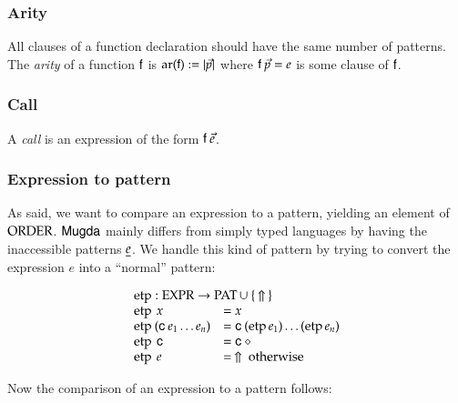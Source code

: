 \newcommand{\cmp}{\opn{cmp}}
\newcommand{\cmpv}{\opn{cmp_v}}
\newcommand{\cmps}{\opn{cmps}}
\newcommand{\cmpsv}{\opn{cmpsv}}
\newcommand{\etp}{\opn{etp}}
\newcommand{\extr}{\opn{extr}}

\newcommand{\ar}{\opn{ar}}

\subsubsection{Arity}
All clauses of a function declaration should have the same number of patterns.\\
The \emph{arity} of a function $\mathsf{f}$  is $\ar(\ff) := \vert \vec{p} \vert $ where $\mathsf{f} \: \vec{p} = e $ is some clause of $\mathsf{f}$.   

\subsubsection{Call}
A \emph{call} is an expression of the form $\mathsf{f} \: \vec{e}$.


\subsubsection{Expression to pattern}

As said, we want to compare an expression to a pattern, yielding an element of $\operatorname{ORDER}$.
$\textsf{Mugda}$ mainly differs from simply typed languages by having the inaccessible patterns $\underline{e}$.
We handle this kind of pattern by trying to convert the expression $e$ into a ``normal'' pattern:

\[
\begin{array}[t]{ll}
\multicolumn{2}{l}{\etp : \Expr \ra \Pat \cup \: \{ \: \stuck \: \} }\\ 
\etp \: x & = x \\
\etp \: (\cc \: e_1 \ldots e_n ) & = \cc \: (\etp e_1) \ldots (\etp e_n) \\
\etp \: \cc & = \cc \: \diamond \\
\etp \: e & = \: \stuck \mbox{ otherwise}
\end{array}
\]

\noindent Now the comparison of an expression to a pattern follows: 

